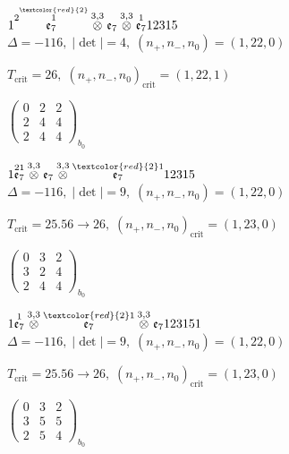\documentclass[10pt]{article}
\begin{document}
\smallskip

$1\overset{2\overset{\textcolor{red}{2}}{1}}{\mathfrak{e}_7}\overset{3,3}{\otimes}\mathfrak{e}_7\overset{3,3}{\otimes}\overset{1}{\mathfrak{e}_7}12315$ \quad $\Delta=-116,\; |\det|=4,\; (n_+,n_-,n_0)=(1,22,0)$

\hspace{1em}$T_{\text{crit}}=26,\; (n_+,n_-,n_0)_{\text{crit}}=(1,22,1)$

\hspace{2em}$\left(\begin{smallmatrix}0 & 2 & 2 \\ 2 & 4 & 4 \\ 2 & 4 & 4\end{smallmatrix}\right)_{\!b_0}$

$1\overset{21}{\mathfrak{e}_7}\overset{3,3}{\otimes}\mathfrak{e}_7\overset{3,3}{\otimes}\overset{\textcolor{red}{2}1}{\mathfrak{e}_7}12315$ \quad $\Delta=-116,\; |\det|=9,\; (n_+,n_-,n_0)=(1,22,0)$

\hspace{1em}$T_{\text{crit}}=25.56 \to 26,\; (n_+,n_-,n_0)_{\text{crit}}=(1,23,0)$

\hspace{2em}$\left(\begin{smallmatrix}0 & 3 & 2 \\ 3 & 2 & 4 \\ 2 & 4 & 4\end{smallmatrix}\right)_{\!b_0}$

\smallskip

$1\overset{1}{\mathfrak{e}_7}\overset{3,3}{\otimes}\overset{\textcolor{red}{2}1}{\mathfrak{e}_7}\overset{3,3}{\otimes}\mathfrak{e}_7123151$ \quad $\Delta=-116,\; |\det|=9,\; (n_+,n_-,n_0)=(1,22,0)$

\hspace{1em}$T_{\text{crit}}=25.56 \to 26,\; (n_+,n_-,n_0)_{\text{crit}}=(1,23,0)$

\hspace{2em}$\left(\begin{smallmatrix}0 & 3 & 2 \\ 3 & 5 & 5 \\ 2 & 5 & 4\end{smallmatrix}\right)_{\!b_0}$
\end{document}
